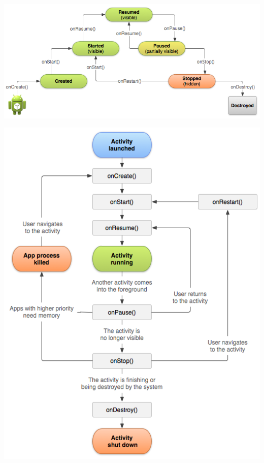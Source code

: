 \documentclass{beamer}
\begin{document}
\begin{frame}
\begin{center}
\includegraphics[scale=0.5]{basic-lifecycle.png}
\end{center}
\end{frame}

\begin{frame}
\begin{center}
\includegraphics[scale=0.3]{activity_lifecycle.png}
\end{center}

\end{frame}
\end{document}
